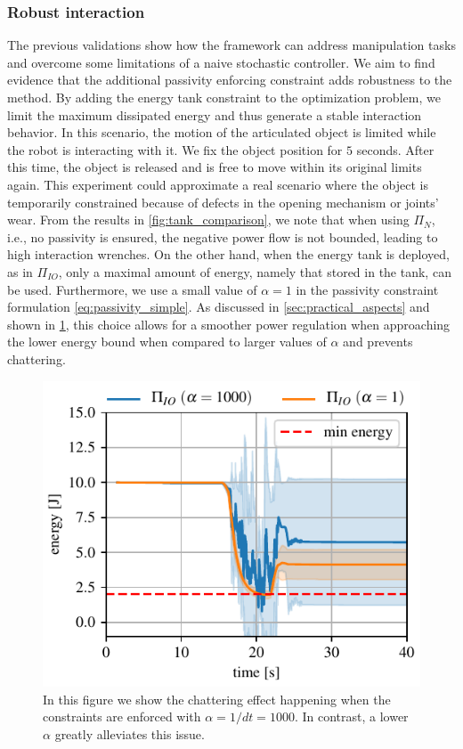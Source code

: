 \subsubsection{Robust interaction}
The previous validations show how the framework can address manipulation tasks and overcome some limitations of a naive stochastic controller. We aim to find evidence that the additional passivity enforcing constraint adds robustness to the method. By adding the energy tank constraint to the optimization problem, we limit the maximum dissipated energy and thus generate a stable interaction behavior. In this scenario, the motion of the articulated object is limited while the robot is interacting with it. We fix the object position for $5$ seconds. After this time, the object is released and is free to move within its original limits again. This experiment could approximate a real scenario where the object is temporarily constrained because of defects in the opening mechanism or joints' wear. From the results in \fig \ref{fig:tank_comparison}, we note that when using $\Pi_{N}$, i.e., no passivity is ensured, the negative power flow is not bounded, leading to high interaction wrenches. On the other hand, when the energy tank is deployed, as in $\Pi_{IO}$, only a maximal amount of energy, namely that stored in the tank, can be used. Furthermore, we use a small value of $\alpha=1$ in the passivity constraint formulation \eqref{eq:passivity_simple}. As discussed in \sect \ref{sec:practical_aspects} and shown in \fig \ref{fig:tank_as_zbf}, this choice allows for a smoother power regulation when approaching the lower energy bound when compared to larger values of $\alpha$ and prevents chattering. 

\begin{figure}[t]
\centering
\includegraphics[width=0.8\columnwidth]{figures/fix_experiment/passivity_coefficient_comparison.pdf}
\caption{In this figure we show the chattering effect happening when the constraints are enforced with $\alpha = 1/dt = 1000$. In contrast, a lower $\alpha$ greatly alleviates this issue.}\label{fig:tank_as_zbf}
\end{figure}

